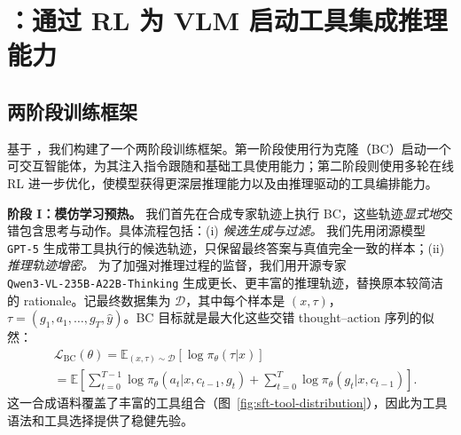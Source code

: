 \section{\ours：通过 RL 为 VLM 启动工具集成推理能力}
\label{sec:training}

\subsection{两阶段训练框架}
基于 \env{}，我们构建了一个两阶段训练框架。第一阶段使用行为克隆（BC）启动一个可交互智能体，为其注入指令跟随和基础工具使用能力；第二阶段则使用多轮在线 RL 进一步优化，使模型获得更深层推理能力以及由推理驱动的工具编排能力。

\noindent \textbf{阶段 I：模仿学习预热。}
我们首先在合成专家轨迹上执行 BC，这些轨迹\emph{显式地}交错包含思考与动作。具体流程包括：(i) \textit{候选生成与过滤。} 我们先用闭源模型 \texttt{GPT‑5} 生成带工具执行的候选轨迹，只保留最终答案与真值完全一致的样本；(ii) \textit{推理轨迹增密。} 为了加强对推理过程的监督，我们用开源专家 \texttt{Qwen3‑VL‑235B‑A22B‑Thinking} 生成更长、更丰富的推理轨迹，替换原本较简洁的 rationale。记最终数据集为 $\mathcal{D}$，其中每个样本是 $(x,\tau)$，$\tau{=}(g_1,a_1,\ldots,g_T,\hat{y})$。BC 目标就是最大化这些交错 thought–action 序列的似然：
\begin{equation*}
    \begin{aligned}
        &\mathcal{L}_{\text{BC}}(\theta)=\mathbb{E}_{(x,\tau)\sim\mathcal{D}}[\log\pi_\theta(\tau|x)]\\
        &=\mathbb{E}\left[\sum_{t=0}^{T-1}\log\pi_\theta(a_t|x,c_{t-1},g_t)+\sum_{t=0}^{T}\log\pi_\theta(g_t|x,c_{t-1})\right].
    \end{aligned}
\end{equation*}
这一合成语料覆盖了丰富的工具组合（图~\ref{fig:sft-tool-distribution}），因此为工具语法和工具选择提供了稳健先验。

